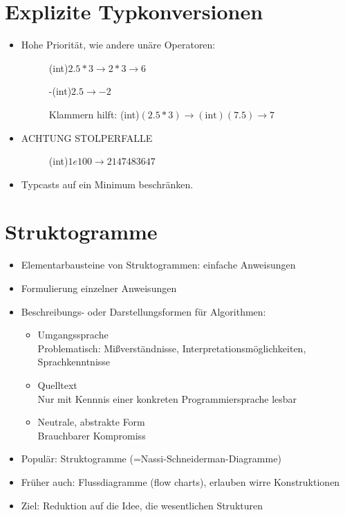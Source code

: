\section{Explizite Typkonversionen}
\begin{itemize}
	\item Hohe Priorität, wie andere unäre Operatoren:
	\begin{description}
		\item [] (int)$2.5*3\rightarrow 2*3 \rightarrow 6$
		\item [] -(int)$2.5 \rightarrow -2$
		\item [] Klammern hilft: (int)$(2.5*3) \rightarrow (\textrm{int})(7.5) \rightarrow 7$
	\end{description}
	\item ACHTUNG STOLPERFALLE
	\begin{description}
		\item[] (int)$1e100 \rightarrow 2147483647$
	\end{description}
	\item Typcasts auf ein Minimum beschränken.
\end{itemize}
%
%
%
\section{Struktogramme}
\begin{itemize}
	\item Elementarbausteine von Struktogrammen: einfache Anweisungen
	\item Formulierung einzelner Anweisungen
	\item Beschreibungs- oder Darstellungsformen für Algorithmen:
	\begin{itemize}
		\item Umgangssprache \\
		Problematisch: Mißverständnisse, Interpretationsmöglichkeiten, 
		Sprachkenntnisse
		\item Quelltext\\
		Nur mit Kennnis einer konkreten Programmiersprache lesbar
		\item Neutrale, abstrakte Form\\
		Brauchbarer Kompromiss
	\end{itemize}
	\item Populär: Struktogramme (=Nassi-Schneiderman-Diagramme)
	\item Früher auch: Flussdiagramme (flow charts), erlauben wirre Konstruktionen
	\item Ziel: Reduktion auf die Idee, die wesentlichen Strukturen
\end{itemize}
